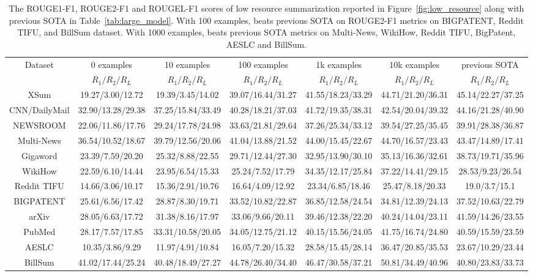 \begin{table}[hbt!]
\scriptsize
\centering
\renewcommand{\arraystretch}{1.3}
\begin{tabular}{ccccccc}
\hline
Dataset & 0 examples & 10 examples & 100 examples & 1k examples & 10k examples & previous SOTA \\
 & $R_1/R_2/R_L$ & $R_1/R_2/R_L$ & $R_1/R_2/R_L$ & $R_1/R_2/R_L$ & $R_1/R_2/R_L$  &  $R_1/R_2/R_L$    \\ \hline
XSum & 19.27/3.00/12.72 & 19.39/3.45/14.02 & 39.07/16.44/31.27 & 41.55/18.23/33.29 & 44.71/21.20/36.31 & 45.14/22.27/37.25 \\
CNN/DailyMail & 32.90/13.28/29.38 & 37.25/15.84/33.49 & 40.28/18.21/37.03 & 41.72/19.35/38.31 & 42.54/20.04/39.32  & 44.16/21.28/40.90 \\
NEWSROOM & 22.06/11.86/17.76 & 29.24/17.78/24.98 & 33.63/21.81/29.64 & 37.26/25.34/33.12 & 39.54/27.25/35.45 & 39.91/28.38/36.87 \\
Multi-News & 36.54/10.52/18.67 & 39.79/12.56/20.06 & 41.04/13.88/21.52 & 44.00/15.45/22.67 & 44.70/16.57/23.43 & 43.47/14.89/17.41 \\
Gigaword & 23.39/7.59/20.20 & 25.32/8.88/22.55 & 29.71/12.44/27.30 & 32.95/13.90/30.10 & 35.13/16.36/32.61 & 38.73/19.71/35.96 \\
WikiHow & 22.59/6.10/14.44 & 23.95/6.54/15.33 & 25.24/7.52/17.79 & 34.35/12.17/25.84 & 37.22/14.41/29.15 & 28.53/9.23/26.54 \\
Reddit TIFU & 14.66/3.06/10.17 & 15.36/2.91/10.76 & 16.64/4.09/12.92 & 23.34/6.85/18.46 & 25.47/8.18/20.33 & 19.0/3.7/15.1 \\
BIGPATENT & 25.61/6.56/17.42 & 28.87/8.30/19.71 & 33.52/10.82/22.87 & 36.85/12.58/24.54 & 34.81/12.39/24.13 & 37.52/10.63/22.79 \\
arXiv & 28.05/6.63/17.72 & 31.38/8.16/17.97 & 33.06/9.66/20.11 & 39.46/12.38/22.20 & 40.24/14.04/23.11 & 41.59/14.26/23.55\\
PubMed & 28.17/7.57/17.85 & 33.31/10.58/20.05 & 34.05/12.75/21.12 & 40.15/15.56/24.05 & 41.75/16.74/24.80 & 40.59/15.59/23.59 \\
AESLC & 10.35/3.86/9.29 & 11.97/4.91/10.84 & 16.05/7.20/15.32 & 28.58/15.45/28.14 & 36.47/20.85/35.53 & 23.67/10.29/23.44 \\
BillSum & 41.02/17.44/25.24 & 40.48/18.49/27.27 & 44.78/26.40/34.40 & 46.47/30.58/37.21 & 50.81/34.49/40.96 & 40.80/23.83/33.73 \\
\hline
\end{tabular}
\caption{The ROUGE1-F1, ROUGE2-F1 and ROUGEL-F1 scores of low resource summarization reported in Figure~\ref{fig:low_resource} along with previous SOTA in Table~\ref{tab:large_model}.
With 100 examples, \pegasuslarge beats previous SOTA on ROUGE2-F1 metrics on BIGPATENT, Reddit TIFU, and BillSum dataset. 
With 1000 examples, \pegasuslarge beats previous SOTA metrics on Multi-News, WikiHow, Reddit TIFU, BigPatent, AESLC and BillSum.
}
\label{tab:low_resource_rouge_scores}
\end{table}